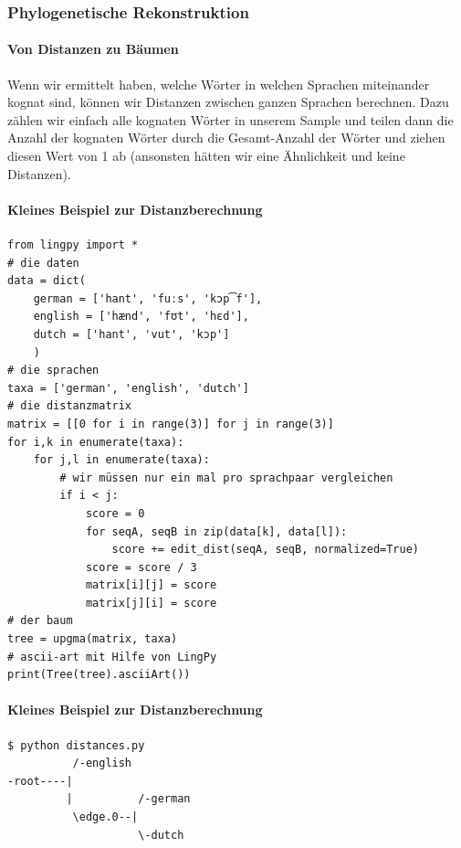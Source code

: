 \subsubsection{\texorpdfstring{{Phylogenetische
Rekonstruktion}}{Phylogenetische Rekonstruktion}}

\paragraph{Von Distanzen zu Bäumen}

Wenn wir ermittelt haben, welche Wörter in welchen Sprachen miteinander
kognat sind, können wir Distanzen zwischen ganzen Sprachen berechnen.
Dazu zählen wir einfach alle kognaten Wörter in unserem Sample und
teilen dann die Anzahl der kognaten Wörter durch die Gesamt-Anzahl der
Wörter und ziehen diesen Wert von 1 ab (ansonsten hätten wir eine
Ähnlichkeit und keine Distanzen).




\paragraph{Kleines Beispiel zur Distanzberechnung}

\begin{verbatim}
from lingpy import *
# die daten
data = dict(
    german = ['hant', 'fuːs', 'kɔp͡f'],
    english = ['hænd', 'fʊt', 'hɛd'],
    dutch = ['hant', 'vut', 'kɔp']
    )
# die sprachen
taxa = ['german', 'english', 'dutch']
# die distanzmatrix
matrix = [[0 for i in range(3)] for j in range(3)]
for i,k in enumerate(taxa):
    for j,l in enumerate(taxa):
        # wir müssen nur ein mal pro sprachpaar vergleichen
        if i < j:
            score = 0
            for seqA, seqB in zip(data[k], data[l]):
                score += edit_dist(seqA, seqB, normalized=True)
            score = score / 3
            matrix[i][j] = score
            matrix[j][i] = score
# der baum
tree = upgma(matrix, taxa)
# ascii-art mit Hilfe von LingPy
print(Tree(tree).asciiArt())
\end{verbatim}




\paragraph{Kleines Beispiel zur Distanzberechnung}

\begin{verbatim}
$ python distances.py
          /-english
-root----|
         |          /-german
          \edge.0--|
                    \-dutch
\end{verbatim}

